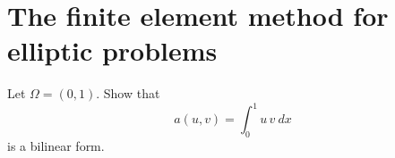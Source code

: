 \section{The finite element method for elliptic problems}

\begin{exercise}
    Let $\Omega = (0, 1)$.
    Show that
    \begin{equation*}
        a(u, v) = \int_0^1 u \, v \ dx
    \end{equation*}
    is a bilinear form.
\end{exercise}